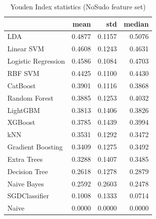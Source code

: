 \begin{table}
\caption{Youden Index statistics (NoSudo feature set)}
\label{tab:youden_NoSudo_stats}
\begin{tabular}{lrrr}
\toprule
 & mean & std & median \\
\midrule
LDA & 0.4877 & 0.1157 & 0.5076 \\
Linear SVM & 0.4608 & 0.1243 & 0.4631 \\
Logistic Regression & 0.4586 & 0.1084 & 0.4703 \\
RBF SVM & 0.4425 & 0.1100 & 0.4430 \\
CatBoost & 0.3901 & 0.1116 & 0.3868 \\
Random Forest & 0.3885 & 0.1253 & 0.4032 \\
LightGBM & 0.3813 & 0.1406 & 0.3826 \\
XGBoost & 0.3785 & 0.1439 & 0.3994 \\
kNN & 0.3531 & 0.1292 & 0.3472 \\
Gradient Boosting & 0.3409 & 0.1275 & 0.3492 \\
Extra Trees & 0.3288 & 0.1407 & 0.3485 \\
Decision Tree & 0.2618 & 0.1278 & 0.2879 \\
Naive Bayes & 0.2592 & 0.2603 & 0.2478 \\
SGDClassifier & 0.1008 & 0.1333 & 0.0714 \\
Naive & 0.0000 & 0.0000 & 0.0000 \\
\bottomrule
\end{tabular}
\end{table}

